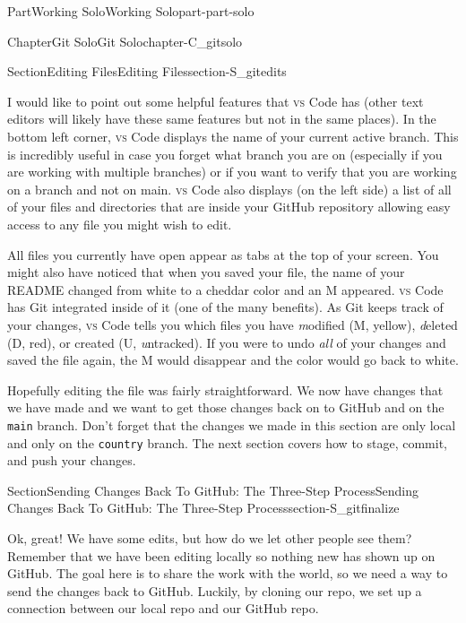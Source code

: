 \documentclass[twoside,10pt,]{book}
\newcommand{\mono}[1]{\texttt{#1}}
\newcommand{\initialism}[1]{\textsc{\MakeLowercase{#1}}}
\begin{document}
\begin{partptx}{Part}{Working Solo}{}{Working Solo}{}{}{part-part-solo}
\begin{chapterptx}{Chapter}{Git Solo}{}{Git Solo}{}{}{chapter-C_gitsolo}
\begin{sectionptx}{Section}{Editing Files}{}{Editing Files}{}{}{section-S_gitedits}
\par
I would like to point out some helpful features that \initialism{VS} Code has (other text editors will likely have these same features but not in the same places). In the bottom left corner, \initialism{VS} Code displays the name of your current active branch. This is incredibly useful in case you forget what branch you are on (especially if you are working with multiple branches) or if you want to verify that you are working on a branch and not on main. \initialism{VS} Code also displays (on the left side) a list of all of your files and directories that are inside your GitHub repository allowing easy access to any file you might wish to edit.%
\par
All files you currently have open appear as tabs at the top of your screen. You might also have noticed that when you saved your file, the name of your README changed from white to a cheddar color and an M appeared. \initialism{VS} Code has Git integrated inside of it (one of the many benefits). As Git keeps track of your changes, \initialism{VS} Code tells you which files you have \emph{m}odified (M, yellow), \emph{d}eleted (D, red), or created (U, \emph{u}ntracked). If you were to undo \emph{all} of your changes and saved the file again, the M would disappear and the color would go back to white.%
\par
Hopefully editing the file was fairly straightforward. We now have changes that we have made and we want to get those changes back on to GitHub and on the \mono{main} branch. Don't forget that the changes we made in this section are only local and only on the \mono{country} branch. The next section covers how to stage, commit, and push your changes.%
\end{sectionptx}
%
%
\typeout{************************************************}
\typeout{************************************************}
%
\begin{sectionptx}{Section}{Sending Changes Back To GitHub: The Three-Step Process}{}{Sending Changes Back To GitHub: The Three-Step Process}{}{}{section-S_gitfinalize}
%
%
\begin{introduction}{}%
Ok, great! We have some edits, but how do we let other people see them? Remember that we have been editing locally so nothing new has shown up on GitHub. The goal here is to share the work with the world, so we need a way to send the changes back to GitHub. Luckily, by cloning our repo, we set up a connection between our local repo and our GitHub repo.%

\end{introduction}
\end{sectionptx}
\end{chapterptx}
\end{partptx}
\end{document}
